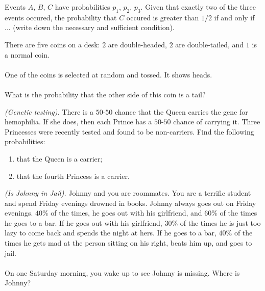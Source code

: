\begin{problem}[Handout 4, \# 15]
  Events \(A\), \(B\), \(C\) have probabilities \(p_1\), \(p_2\),
  \(p_3\). Given that exactly two of the three events occured, the
  probability that \(C\) occured is greater than \(1/2\) if and only if
  ... (write down the necessary and sufficient condition).
\end{problem}
\begin{solution}

\end{solution}
\newpage

\begin{problem}[Handout 5, \# 1]
  There are five coins on a desk: \(2\) are double-headed, \(2\) are
  double-tailed, and \(1\) is a normal coin.
  \\\\
  One of the coins is selected at random and tossed. It shows heads.
  \\\\
  What is the probability that the other side of this coin is a tail?
\end{problem}
\begin{solution}

\end{solution}
\newpage

\begin{problem}[Handout 5, \# 2]
  \emph{(Genetic testing).} There is a \(50\)-\(50\) chance that the Queen
  carries the gene for hemophilia. If she does, then each Prince has a
  \(50\)-\(50\) chance of carrying it. Three Princesses were recently
  tested and found to be non-carriers. Find the following probabilities:
  \begin{enumerate}[label=(\alph*),noitemsep]
  \item that the Queen is a carrier;
  \item that the fourth Princess is a carrier.
  \end{enumerate}
\end{problem}
\begin{solution}

\end{solution}
\newpage

\begin{problem}[Handout 5, \# 4]
  \emph{(Is Johnny in Jail).} Johnny and you are roommates. You are a
  terrific student and spend Friday evenings drowned in books. Johnny
  always goes out on Friday evenings. \(40\%\) of the times, he goes out
  with his girlfriend, and \(60\%\) of the times he goes to a bar. If he
  goes out with his girlfriend, \(30\%\) of the times he is just too lazy
  to come back and spends the night at hers. If he goes to a bar, \(40\%\)
  of the times he gets mad at the person sitting on his right, beats him
  up, and goes to jail.
  \\\\
  On one Saturday morning, you wake up to see Johnny is missing. Where is
  Johnny?
\end{problem}
\begin{solution}

\end{solution}


